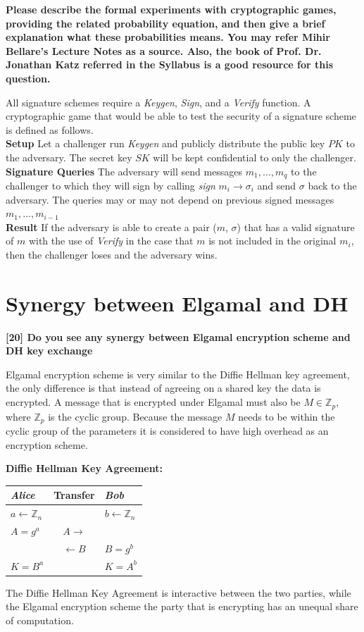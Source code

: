 \documentclass[letterpaper,11pt,notitlepage,fleqn]{article}
\begin{document}
\noindent \textbf{Please  describe  the  formal  experiments  with  cryptographic  games,  providing  the  related probability equation, and then give a brief explanation what these probabilities means. You may refer Mihir Bellare’s Lecture Notes as a source. Also, the book of Prof. Dr. Jonathan Katz referred in the Syllabus is a good resource for this question.}

All signature schemes require a \textit{Keygen}, \textit{Sign}, and a \textit{Verify} function. A cryptographic game that would be able to test the security of a signature scheme is defined as follows.\\
\textbf{Setup} Let a challenger run \textit{Keygen} and publicly distribute the public key $PK$ to the adversary. The secret key $SK$ will be kept confidential to only the challenger. \\
\textbf{Signature Queries} The adversary will send messages $m_{1}, \dots, m_{q}$ to the challenger to which they will sign by calling \textit{sign} $m_{i} \rightarrow \sigma_{i}$ and send $\sigma$ back to the adversary. The queries may or may not depend on previous signed messages $m_{1}, \dots, m_{i-1}$ \\
\textbf{Result} If the adversary is able to create a pair ($m$, $\sigma$) that has a valid signature of $m$ with the use of \textit{Verify} in the case that $m$ is not included in the original $m_{i}$, then the challenger loses and the adversary wins. 

\section{Synergy between Elgamal and DH}
\noindent \textbf{[20] Do you see any synergy between Elgamal encryption scheme and DH key exchange}

Elgamal encryption scheme is very similar to the Diffie Hellman key agreement, the only difference is that instead of agreeing on a shared key the data is encrypted. A message that is encrypted under Elgamal must also be $M \in \mathbb{Z}_{p}$, where $\mathbb{Z}_{p}$ is the cyclic group. Because the message $M$ needs to be within the cyclic group of the parameters it is considered to have high overhead as an encryption scheme. 

\noindent \textbf{Diffie Hellman Key Agreement:} \\
\begin{center}
\begin{tabular}{|l c l|}
    \hline
    \textit{Alice} & Transfer & \textit{Bob} \\
    \hline
    $a \leftarrow \mathbb{Z}_{n}$ & & $b \leftarrow \mathbb{Z}_{n}$ \\ 
    $A = g^a$ & $A \rightarrow$ & \\
    & $\leftarrow B$ & $ B = g^b $ \\
    $K = B^{a}$ & & $K = A^{b}$ \\
    \hline
\end{tabular}
\end{center}
The Diffie Hellman Key Agreement is interactive between the two parties, while the Elgamal encryption scheme the party that is encrypting has an unequal share of computation. 
\end{document}
